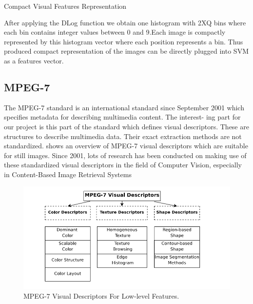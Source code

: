  

 

Compact Visual Features Representation

After applying the DLog function we obtain one histogram with 2XQ bins where each bin contains integer values between 0 and 9.Each image is compactly represented by this histogram vector where each position represents a bin. Thus produced compact representation of the images can be directly plugged into SVM as a features vector.

 

 

\clearpage
\subsection {MPEG-7}



The MPEG-7 standard\cite{Mpeg} is an international standard since September 2001
which specifies metadata for describing multimedia content. The interest-
ing part for our project is this part of the standard which defines visual
descriptors. These are structures to describe multimedia data. Their exact
extraction methods are not standardized.  shows an overview of
MPEG-7 visual descriptors which are suitable for still images.
Since 2001, lots of research has been conducted on making use of these
standardized visual descriptors in the field of Computer Vision, especially in
Content-Based Image Retrieval Systems 
\begin{figure}[h]
  \centering
  \includegraphics[width=6in]{Mpeg7}
  \caption  {MPEG-7 Visual Descriptors For Low-level Features.}
   \label{Mpeg7}
\end{figure}


